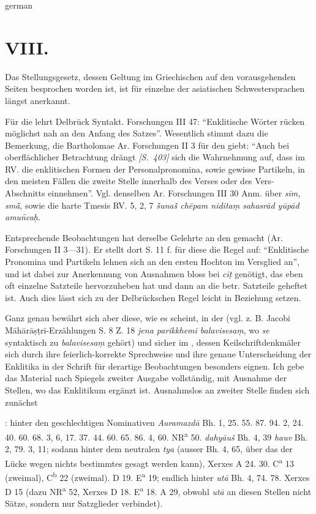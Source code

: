 \begin{otherlanguage*}{german}
\section*{VIII.}

Das Stellungsgesetz, dessen Geltung im Griechischen auf den vorausgehenden Seiten besprochen worden ist, ist für einzelne der asiatischen Schwestersprachen längst anerkannt.

Für die  lehrt Delbrück Syntakt. Forschungen III 47: “Enklitische Wörter rücken möglichst nah an den Anfang des Satzes”. Wesentlich stimmt dazu die Bemerkung, die Bartholomae Ar. Forschungen II 3 für den  giebt: “Auch bei oberflächlicher Betrachtung drängt \hypertarget{p403}{\emph{[S.~403]}}\label{p403} sich die Wahrnehmung auf, dass im RV. die enklitischen Formen der Personalpronomina, sowie gewisse Partikeln, in den meisten Fällen die zweite Stelle innerhalb des Verses oder des Vers-Abschnitts einnehmen”. Vgl. denselben Ar. Forschungen III 30 Anm. über \emph{sīm, smā̆}, sowie die harte Tmesis RV. 5, 2, 7 \emph{ṧunaṧ  chēpam niditaṃ sahasrād yūpād amun̑caḥ}.

Entsprechende Beobachtungen hat derselbe Gelehrte an den  gemacht (Ar. Forschungen II 3—31). Er stellt dort S. 11 f. für diese die Regel auf: “Enklitische Pronomina und Partikeln lehnen sich an den ersten Hochton im Versglied an”, und ist dabei zur Anerkennung von Ausnahmen bloss bei \emph{cīṭ} genötigt, das eben oft einzelne Satzteile hervorzuheben hat und dann an die betr. Satzteile geheftet ist. Auch dies lässt sich zu der Delbrückschen Regel leicht in Beziehung setzen.

Ganz genau bewährt sich aber diese, wie es scheint, in der  (vgl. z. B. Jacobi Māhārāṣṭrī-Erzählungen S. 8 Z. 18 \emph{jena  parikkhemi balavisesaṃ}, wo \emph{se} syntaktisch zu \emph{balavisesaṃ} gehört) und sicher im , dessen Keilschriftdenkmäler sich durch ihre feierlich-korrekte Sprechweise und ihre genaue Unterscheidung der Enklitika in der Schrift für derartige Beobachtungen besonders eignen. Ich gebe das Material nach Spiegels zweiter Ausgabe vollständig, mit Ausnahme der Stellen, wo das Enklitikum ergänzt ist. Ausnahmslos an zweiter Stelle finden sich zunächst

\emph{}: hinter den geschlechtigen Nominativen \emph{Auramazdā} Bh. 1, 25. 55. 87. 94. 2, 24. 40. 60. 68. 3, 6, 17. 37. 44. 60. 65. 86. 4, 60. NR\textsuperscript{a} 50. \emph{dahyāuš} Bh. 4, 39 \emph{hauv} Bh. 2, 79. 3, 11; sodann hinter dem neutralen \emph{tya} (ausser Bh. 4, 65, über das der Lücke wegen nichts bestimmtes gesagt werden kann), Xerxes A 24. 30. C\textsuperscript{a} 13 (zweimal), C\textsuperscript{b} 22 (zweimal). D 19. E\textsuperscript{a} 19; endlich hinter \emph{utā} Bh. 4, 74. 78. Xerxes D 15 (dazu NR\textsuperscript{a} 52, Xerxes D 18. E\textsuperscript{a} 18. A 29, obwohl \emph{utā} an diesen Stellen nicht Sätze, sondern nur Satzglieder verbindet).


\end{otherlanguage*}
